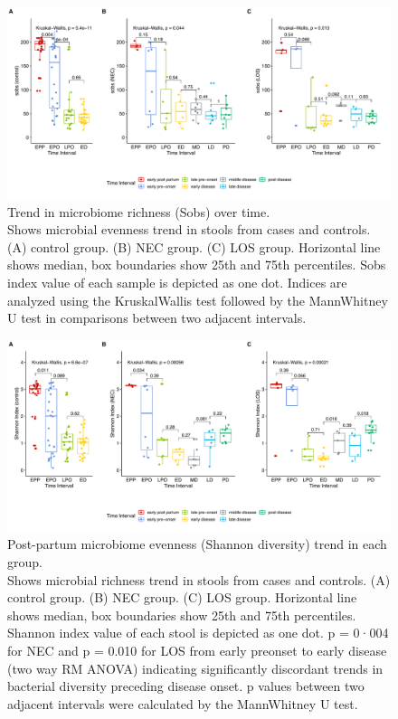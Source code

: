 \documentclass[fleqn,10pt, lineno]{wlpeerj} %
\begin{document}
\begin{figure}[ht]\centering
  \includegraphics[width=\linewidth]{sobs-group-time2.pdf}
  \caption{Trend in microbiome richness (Sobs) over time. \\  Shows microbial evenness trend in stools from cases and controls. (A) control group.  (B) NEC group. (C) LOS group. Horizontal line shows median, box boundaries show 25th and 75th percentiles. Sobs index value of each sample is depicted as one dot. Indices are analyzed using the Kruskal\-Wallis test followed by the Mann\-Whitney U test in comparisons between two adjacent intervals.}
  \label{fig:sobs-group-time}
\end{figure}

\begin{figure}[ht]\centering
  \includegraphics[width=\linewidth]{Shannon-group-time2.pdf}
  \caption{Post-partum microbiome evenness (Shannon diversity) trend in each group. \\ Shows microbial richness trend in stools from cases and controls. (A) control group. (B) NEC group. (C) LOS group. Horizontal line shows median, box boundaries show 25th and 75th percentiles. Shannon index value of each stool is depicted as one dot. p = 0·004 for NEC and p = 0.010 for LOS from early pre\-onset to early disease (two way RM ANOVA) indicating significantly discordant trends in bacterial diversity preceding disease onset. p values between two adjacent intervals were calculated by the Mann\-Whitney U test. }
  \label{fig:Shannon-group-time}
\end{figure}
\end{document}
